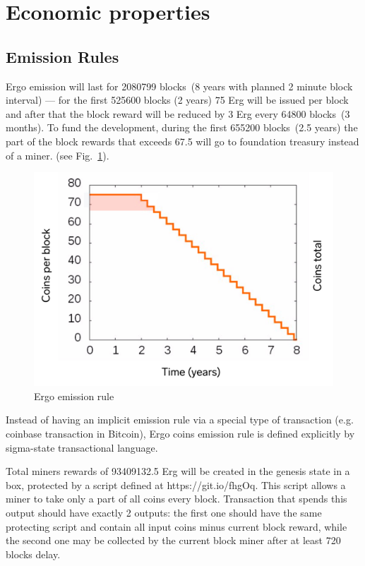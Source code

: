 \section{Economic properties}

\subsection{Emission Rules}

Ergo emission will last for 2080799 blocks~(8 years with planned 2 minute block interval) --- for the
first 525600 blocks (2 years) 75 Erg will be issued per block and after that the block reward will be
reduced by 3 Erg every 64800 blocks~(3 months).
To fund the development, during the first 655200 blocks~(2.5 years) the part of the block rewards that
exceeds 67.5 will go to foundation treasury instead of a miner.  (see Fig.~\ref{fig:emission}).

\begin{figure}[H]
    \centering
    \includegraphics[width=\textwidth]{img/emission.jpg}
    \caption{Ergo emission rule
    \label{fig:emission}}
\end{figure}


Instead of having an implicit emission rule via a special type of transaction (e.g. coinbase transaction in Bitcoin),
Ergo coins emission rule is defined explicitly by sigma-state transactional language.

Total miners rewards of 93409132.5 Erg will be created in the genesis state in a box,
protected by a script defined at https://git.io/fhgOq.
This script allows a miner to take only a part of all coins every block.
Transaction that spends this output should have exactly 2 outputs: the first one should
have the same protecting script and contain all input coins minus current block reward,
while the second one may be collected by the current block miner after at least
720 blocks delay.

